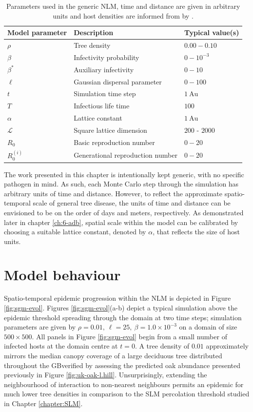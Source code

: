 \begin{table}
\centering
\begin{tabular}{l l l}
\hline
\textbf{Model parameter} & \textbf{Description} & \textbf{Typical value(s)}\\
\hline
$\rho$  & Tree density & $0.00 - 0.10$ \\ 
$\beta$ & Infectivity probability & $0 - 10^{-3}$ \\
$\beta^*$ & Auxiliary infectivity & $0 - 10$ \\
$\ell$ & Gaussian dispersal parameter & $ 0 - 100$ \\
$t$ & Simulation time step & $1\ \mathrm{Au}$\\
$T$ & Infectious life time & $100$  \\
$\alpha$ & Lattice constant & $1\ \mathrm{Au}$ \\
$\mathcal{L}$ & Square lattice dimension & $200$ - $2000$ \\
$R_0$ & Basic reproduction number & $0-20$ \\
$R_0^{(i)}$ & Generational reproduction number & $0-20$ \\
\hline
\end{tabular}
\caption{Parameters used in the generic NLM, time and distance are given in arbitrary units and host densities are informed from by \cite{hill.data}.}
\label{tab:SIR-model}
\end{table}

The work presented in this chapter is intentionally kept generic, with no specific pathogen in mind.
As such, each Monte Carlo step through the simulation has arbitrary units of time and distance.
However, to reflect the approximate spatio-temporal scale of general tree disease, the units of time and distance can be envisioned to be on the order of days and meters, respectively.
As demonstrated later in chapter \ref{ch:6-adb}, spatial scale within the model can be calibrated by choosing a suitable lattice constant, denoted by $\alpha$, that reflects the size of host units.

\section{Model behaviour}

Spatio-temporal epidemic progression within the NLM is depicted in Figure \ref{fig:sgm-evol}.
Figures \ref{fig:sgm-evol}(a-b) depict a typical simulation above the epidemic threshold spreading through the domain at two time steps;
simulation parameters are given by $\rho=0.01,\ \ell = 25,\ \beta = 1.0 \times 10^{-3}$ on a domain of size $500 \times 500$.
All panels in Figure \ref{fig:sgm-evol} begin from a small number of infected hosts at the domain centre at $t=0$.
A tree density of $0.01$ approximately mirrors the median canopy coverage of a large deciduous tree distributed throughout the GB\textemdash verified by assessing the predicted oak abundance presented previously in Figure \ref{fig:uk-oak-l.hill}.
Unsurprisingly, extending the neighbourhood of interaction to non-nearest neighbours permits an epidemic for much lower tree densities in comparison to the SLM percolation threshold studied in Chapter \ref{chapter:SLM}.

